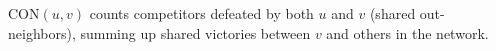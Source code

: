 \documentclass[preview]{standalone}
\begin{document}
$\text{CON}(u, v)$ counts competitors defeated by both $u$ and $v$ (shared out-neighbors), summing up shared victories between $v$ and others in the network.\\
\end{document}

